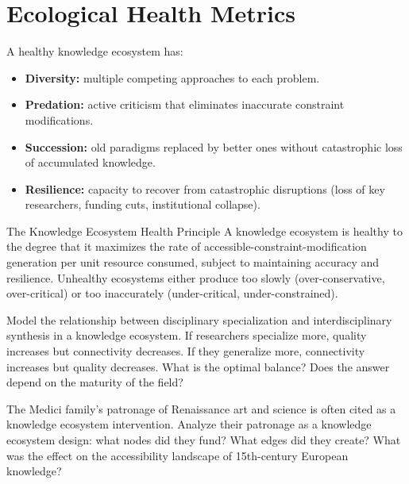 \section{Ecological Health Metrics}

A healthy knowledge ecosystem has:
\begin{itemize}
  \item \textbf{Diversity:} multiple competing approaches to each problem.
  \item \textbf{Predation:} active criticism that eliminates inaccurate
        constraint modifications.
  \item \textbf{Succession:} old paradigms replaced by better ones
        without catastrophic loss of accumulated knowledge.
  \item \textbf{Resilience:} capacity to recover from catastrophic
        disruptions (loss of key researchers, funding cuts, institutional
        collapse).
\end{itemize}

\begin{namedthm}{The Knowledge Ecosystem Health Principle}
  A knowledge ecosystem is healthy to the degree that it maximizes
  the rate of accessible-constraint-modification generation per unit
  resource consumed, subject to maintaining accuracy and resilience.
  Unhealthy ecosystems either produce too slowly (over-conservative,
  over-critical) or too inaccurately (under-critical, under-constrained).
\end{namedthm}

\begin{exercise}
  Model the relationship between disciplinary specialization and
  interdisciplinary synthesis in a knowledge ecosystem. If researchers
  specialize more, quality increases but connectivity decreases.
  If they generalize more, connectivity increases but quality decreases.
  What is the optimal balance? Does the answer depend on the maturity
  of the field?
\end{exercise}

\begin{exercise}
  The Medici family's patronage of Renaissance art and science is
  often cited as a knowledge ecosystem intervention. Analyze their
  patronage as a knowledge ecosystem design: what nodes did they
  fund? What edges did they create? What was the effect on the
  accessibility landscape of 15th-century European knowledge?
\end{exercise}
